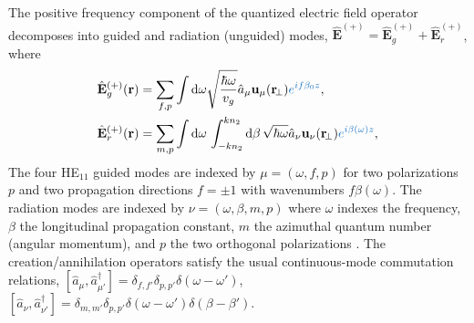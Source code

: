 \documentclass[preprint,aps,pra,onecolumn]{revtex4-1} %
\newcommand{\change}[1]{{\color{RoyalBlue} #1}}
\begin{document}
The positive frequency component of the quantized electric field operator decomposes into guided and radiation (unguided) modes, $\hat{\mathbf{E}}^{(+)}=\hat{\mathbf{E}}_g^{(+)}+\hat{\mathbf{E}}_{r}^{(+)}$, where
\begin{align}
\hat{\mathbf{E}}_g^{(+)}(\br) &= \sum_{f,p} \int \mathrm{d}\omega \sqrt{\frac{ \hbar \omega}{v_g}} 
\hat{a}_\mu \mathbf{u}_\mu (\br\!_\perp) \change{  e^{if\beta_0 z} },\label{Eq::QuantizedElectricField} \\
\hat{\mathbf{E}}_r^{(+)}(\br) &= \sum_{m,p} \int \mathrm{d}\omega  \, \int_{-kn_2}^{kn_2}\mathrm{d}\beta \, 
\sqrt{ \hbar \omega} \hat{a}_\nu \mathbf{u}_\nu (\br\!_\perp) \change{ e^{i\beta(\omega) z} },
\end{align}
The four HE$_{11}$ guided modes are indexed by $\mu =(\omega, f, p)$ for two polarizations $p$ and two propagation directions $f=\pm1$ with wavenumbers $f\beta (\omega)$.  The radiation modes are indexed by \change{ $\nu=(\omega, \beta, m, p)$ where $\omega$ indexes the frequency, $\beta$ the longitudinal propagation constant, $m$ the azimuthal quantum number (angular momentum), and $p$ the two orthogonal polarizations} \cite{sondergaard_general_2001}.  The creation/annihilation operators satisfy the usual continuous-mode commutation relations, $[\hat{a}_\mu, \hat{a}^\dag_{\mu'} ] = \delta_{f,f'} \delta_{p,p'} 
\delta ( \omega - \omega ') $, $[\hat{a}_\nu ,\hat{a}^\dag_{\nu'} ] = \delta_{m,m'} \delta_{p,p'} \delta ( 
\omega - \omega ')  \delta ( \beta - \beta') $.
\end{document}
